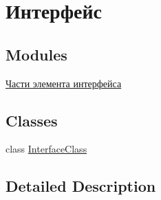 \hypertarget{group___interface}{}\section{Интерфейс}
\label{group___interface}
\subsection*{Modules}
\begin{DoxyCompactItemize}
\item 
\hyperlink{group___interface_blocks}{Части элемента интерфейса}
\end{DoxyCompactItemize}
\subsection*{Classes}
\begin{DoxyCompactItemize}
\item 
class \hyperlink{class_interface_class}{Interface\+Class}
\end{DoxyCompactItemize}


\subsection{Detailed Description}

